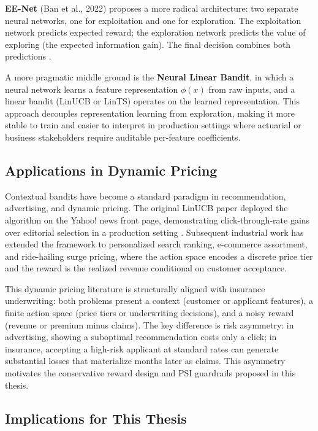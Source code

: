 \textbf{EE-Net} (Ban et al., 2022) proposes a more radical architecture: two separate neural networks, one for exploitation and one for exploration. The exploitation network predicts expected reward; the exploration network predicts the value of exploring (the expected information gain). The final decision combines both predictions \citep{Ban2022}.

A more pragmatic middle ground is the \textbf{Neural Linear Bandit}, in which a neural network learns a feature representation \(\phi(x)\) from raw inputs, and a linear bandit (LinUCB or LinTS) operates on the learned representation. This approach decouples representation learning from exploration, making it more stable to train and easier to interpret in production settings where actuarial or business stakeholders require auditable per-feature coefficients.

\subsection{Applications in Dynamic Pricing}\label{applications-in-dynamic-pricing}

Contextual bandits have become a standard paradigm in recommendation, advertising, and dynamic pricing. The original LinUCB paper \citep{Li2010} deployed the algorithm on the Yahoo! news front page, demonstrating click-through-rate gains over editorial selection in a production setting \citep{Li2010}. Subsequent industrial work has extended the framework to personalized search ranking, e-commerce assortment, and ride-hailing surge pricing, where the action space encodes a discrete price tier and the reward is the realized revenue conditional on customer acceptance.

This dynamic pricing literature is structurally aligned with insurance underwriting: both problems present a context (customer or applicant features), a finite action space (price tiers or underwriting decisions), and a noisy reward (revenue or premium minus claims). The key difference is risk asymmetry: in advertising, showing a suboptimal recommendation costs only a click; in insurance, accepting a high-risk applicant at standard rates can generate substantial losses that materialize months later as claims. This asymmetry motivates the conservative reward design and PSI guardrails proposed in this thesis.

\subsection{Implications for This Thesis}\label{implications-for-this-thesis}

